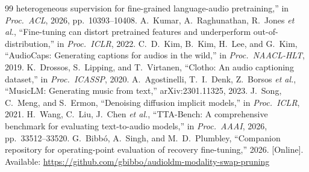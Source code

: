{\begin{thebibliography}{99}
heterogeneous supervision for fine-grained language-audio pretraining,'' in \emph{Proc.\ ACL}, 2026,
pp.~10393--10408.
 A.~Kumar, A.~Raghunathan, R.~Jones \emph{et al.}, ``Fine-tuning
can distort pretrained features and underperform out-of-distribution,'' in \emph{Proc.\ ICLR}, 2022.
 C.~D.~Kim, B.~Kim, H.~Lee, and G.~Kim, ``AudioCaps: Generating captions
for audios in the wild,'' in \emph{Proc.\ NAACL-HLT}, 2019.
 K.~Drossos, S.~Lipping, and T.~Virtanen, ``Clotho: An audio captioning dataset,'' in \emph{Proc.\ ICASSP}, 2020.
 A.~Agostinelli, T.~I.~Denk, Z.~Borsos \emph{et al.}, ``MusicLM:
Generating music from text,'' arXiv:2301.11325, 2023.
 J.~Song, C.~Meng, and S.~Ermon, ``Denoising diffusion implicit models,'' in
\emph{Proc.\ ICLR}, 2021.
 H.~Wang, C.~Liu, J.~Chen \emph{et al.}, ``TTA-Bench: A comprehensive benchmark for evaluating text-to-audio models,'' in \emph{Proc.\ AAAI}, 2026, pp.~33512--33520.
 G.~Bibb\'o, A.~Singh, and M.~D.~Plumbley, ``Companion repository for operating-point evaluation of recovery fine-tuning,'' 2026. [Online]. Available: \url{https://github.com/gbibbo/audioldm-modality-swap-pruning}
\end{thebibliography}}


